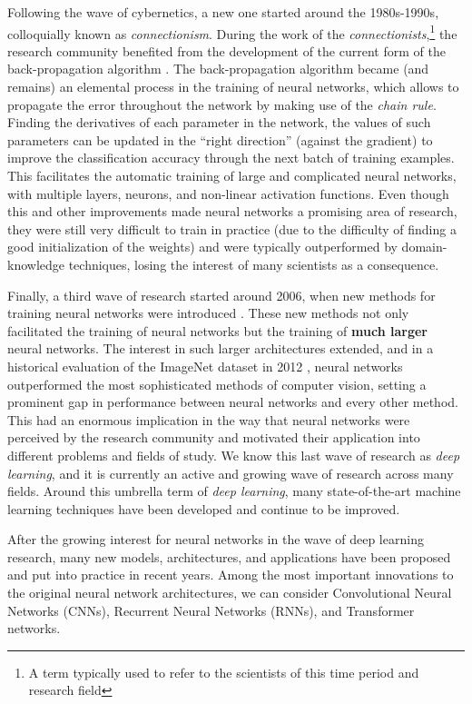 Following the wave of cybernetics, a new one started around
the 1980s-1990s, colloquially known as \emph{connectionism}.
During the work of the \emph{connectionists},\footnote{A
term typically used to refer to the scientists of this time
period and research field} the research community benefited
from the development of the current form of the
back-propagation algorithm
\parencite{rumelhart1988learning}. The back-propagation
algorithm became (and remains) an elemental process in the
training of neural networks, which allows to propagate the
error throughout the network by making use of the
\emph{chain rule}. Finding the derivatives of each parameter
in the network, the values of such parameters can be updated
in the ``right direction'' (against the gradient) to improve
the classification accuracy through the next batch of
training examples. This facilitates the automatic training
of large and complicated neural networks, with multiple
layers, neurons, and non-linear activation functions. Even
though this and other improvements made neural networks a
promising area of research, they were still very difficult
to train in practice (due to the difficulty of finding a
good initialization of the weights) and were typically
outperformed by domain-knowledge techniques, losing the
interest of many scientists as a consequence.

Finally, a third wave of research started around 2006, when
new methods for training neural networks were introduced
\parencite{hinton2006fast}. These new methods not only
facilitated the training of neural networks but the training
of \textbf{much larger} neural networks. The interest in
such larger architectures extended, and in a historical
evaluation of the ImageNet dataset in 2012
\parencite{krizhevsky2012imagenet}, neural networks
outperformed the most sophisticated methods of computer
vision, setting a prominent gap in performance between
neural networks and every other method. This had an enormous
implication in the way that neural networks were perceived
by the research community and motivated their application
into different problems and fields of study. We know this
last wave of research as \emph{deep learning}, and it is
currently an active and growing wave of research across many
fields. Around this umbrella term of \emph{deep learning},
many state-of-the-art machine learning techniques have been
developed and continue to be improved.

After the growing interest for neural networks in the wave
of deep learning research, many new models, architectures,
and applications have been proposed and put into practice in
recent years.
Among the most important innovations to the original neural
network architectures, we can consider Convolutional Neural
Networks (CNNs), Recurrent Neural Networks
(RNNs), and Transformer networks.

